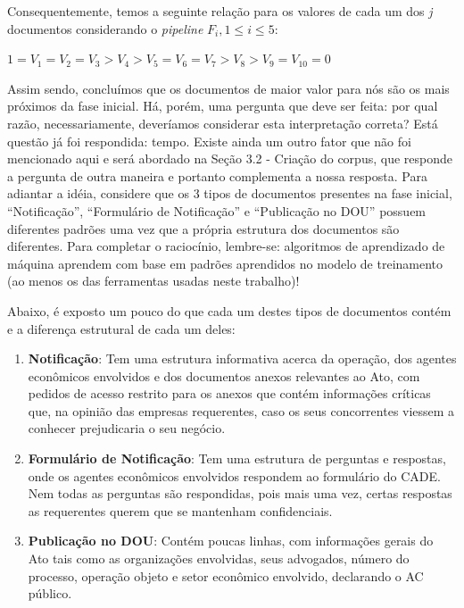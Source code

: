 \documentclass[11pt]{report}
\newcommand{\quotes}[1]{``#1''}
\begin{document}
Consequentemente, temos a seguinte relação para os valores de cada um dos \textit{j} documentos considerando o \textit{pipeline} $F_i, 1 \leq i \leq 5$:
\begin{center}
  $1 = V_1 = V_2 = V_3 > V_4 > V_5 = V_6 = V_7 > V_8 > V_9 = V_{10} = 0$
\end{center}

Assim sendo, concluímos que os documentos de maior valor para nós são os mais próximos da fase inicial. Há, porém, uma pergunta que deve ser feita: por qual razão,
necessariamente, deveríamos considerar esta interpretação correta? Está questão já foi respondida: tempo. Existe ainda um outro fator que não foi mencionado aqui e será abordado
na Seção 3.2 - Criação do corpus, que responde a pergunta de outra maneira e portanto complementa a nossa resposta. Para adiantar a idéia, considere que os 3 tipos de
documentos presentes na fase inicial, \quotes{Notificação}, \quotes{Formulário de Notificação} e \quotes{Publicação no DOU} possuem diferentes padrões uma vez que a própria
estrutura dos documentos são diferentes. Para completar o raciocínio, lembre-se: algoritmos de aprendizado de máquina aprendem com base em padrões aprendidos no modelo
de treinamento (ao menos os das ferramentas usadas neste trabalho)!

Abaixo, é exposto um pouco do que cada um destes tipos de documentos contém e a diferença estrutural de cada um deles:

\begin{enumerate}[label=\textbf{\arabic*.}]
\item \textbf{Notificação}: Tem uma estrutura informativa acerca da operação, dos agentes econômicos envolvidos e dos documentos anexos relevantes ao Ato, com pedidos
de acesso restrito para os anexos que contém informações críticas que, na opinião das empresas requerentes, caso os seus concorrentes viessem a conhecer prejudicaria o seu negócio.
\item \textbf{Formulário de Notificação}: Tem uma estrutura de perguntas e respostas, onde os agentes econômicos envolvidos respondem ao formulário do CADE. Nem todas as perguntas
são respondidas, pois mais uma vez, certas respostas as requerentes querem que se mantenham confidenciais.
\item \textbf{Publicação no DOU}: Contém poucas linhas, com informações gerais do Ato tais como as organizações envolvidas, seus advogados, número do processo, operação objeto
e setor econômico envolvido, declarando o AC público.
\end{enumerate}
\end{document}
